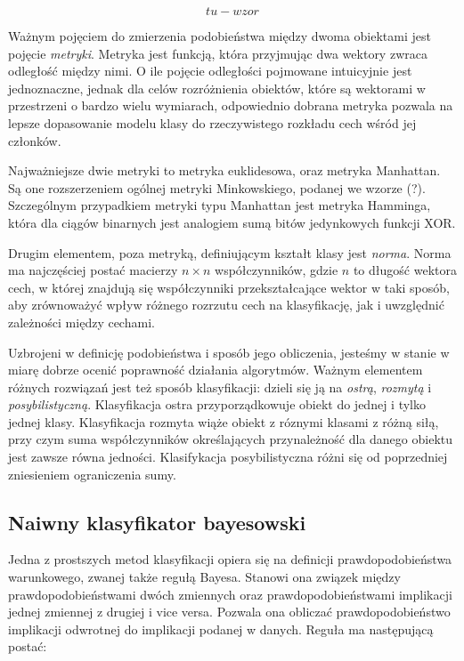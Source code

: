 \documentclass[12pt,a4paper,oneside]{report} %
\begin{document}
\begin{equation}
tu-wzor
\end{equation}

Ważnym pojęciem do zmierzenia podobieństwa między dwoma obiektami jest pojęcie \emph{metryki}. Metryka jest funkcją, która przyjmując dwa wektory zwraca odległość między nimi. O ile pojęcie odległości pojmowane intuicyjnie jest jednoznaczne, jednak dla celów rozróżnienia obiektów, które są wektorami w przestrzeni o bardzo wielu wymiarach, odpowiednio dobrana metryka pozwala na lepsze dopasowanie modelu klasy do rzeczywistego rozkładu cech wśród jej członków.\par

Najważniejsze dwie metryki to metryka euklidesowa, oraz metryka Manhattan. Są one rozszerzeniem ogólnej metryki Minkowskiego, podanej we wzorze (?). Szczególnym przypadkiem metryki typu Manhattan jest metryka Hamminga, która dla ciągów binarnych jest analogiem sumą bitów jedynkowych funkcji XOR. \par

Drugim elementem, poza metryką, definiującym kształt klasy jest \emph{norma}. Norma ma najczęściej postać macierzy $n \times n$ współczynników, gdzie $n$ to długość wektora cech, w której znajdują się współczynniki przekształcające wektor w taki sposób, aby zrównoważyć wpływ różnego rozrzutu cech na klasyfikację, jak i uwzględnić zależności między cechami. \par

Uzbrojeni w definicję podobieństwa i sposób jego obliczenia, jesteśmy w stanie w miarę dobrze ocenić poprawność działania algorytmów. Ważnym elementem różnych rozwiązań jest też sposób klasyfikacji: dzieli się ją na \emph{ostrą}, \emph{rozmytą} i \emph{posybilistyczną}. Klasyfikacja ostra przyporządkowuje obiekt do jednej i tylko jednej klasy. Klasyfikacja rozmyta wiąże obiekt z róznymi klasami z różną siłą, przy czym suma współczynników określających przynależność dla danego obiektu jest zawsze równa jedności. Klasifykacja posybilistyczna różni się od poprzedniej zniesieniem ograniczenia sumy.\par

\subsection{Naiwny klasyfikator bayesowski}

Jedna z prostszych metod klasyfikacji opiera się na definicji prawdopodobieństwa warunkowego, zwanej także regułą Bayesa. Stanowi ona związek między prawdopodobieństwami dwóch zmiennych oraz prawdopodobieństwami implikacji jednej zmiennej z drugiej i vice versa. Pozwala ona obliczać prawdopodobieństwo implikacji odwrotnej do implikacji podanej w danych. Reguła ma następującą postać:
\end{document}
